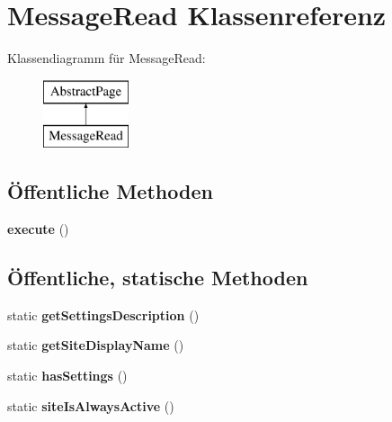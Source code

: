 \hypertarget{class_message_read}{}\section{Message\+Read Klassenreferenz}
\label{class_message_read}
Klassendiagramm für Message\+Read\+:\begin{figure}[H]
\begin{center}
\leavevmode
\includegraphics[height=2.000000cm]{class_message_read}
\end{center}
\end{figure}
\subsection*{Öffentliche Methoden}
\begin{DoxyCompactItemize}
\item 
\mbox{\label{class_message_read_a14d9f593e0331265a5f362aec8c79e56}} 
{\bfseries execute} ()
\end{DoxyCompactItemize}
\subsection*{Öffentliche, statische Methoden}
\begin{DoxyCompactItemize}
\item 
\mbox{\label{class_message_read_aeb9ae4adff43d71f233aeba699b5f64c}} 
static {\bfseries get\+Settings\+Description} ()
\item 
\mbox{\label{class_message_read_abf4ed385165aa11ac9b9fc5c29a9142d}} 
static {\bfseries get\+Site\+Display\+Name} ()
\item 
\mbox{\label{class_message_read_af3c9020ea6095cb94977a84993137a76}} 
static {\bfseries has\+Settings} ()
\item 
\mbox{\label{class_message_read_add2739e2eda78d4e001587b71e0386f5}} 
static {\bfseries site\+Is\+Always\+Active} ()
\end{DoxyCompactItemize}
